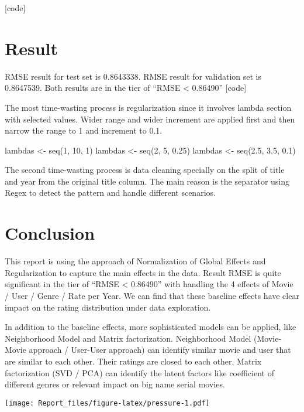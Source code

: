 \documentclass[
]{article}
\begin{document}
{[}code{]}

\hypertarget{result}{%
\section{Result}\label{result}}

RMSE result for test set is 0.8643338. RMSE result for validation set is
0.8647539. Both results are in the tier of ``RMSE \textless{} 0.86490''
{[}code{]}

The most time-wasting process is regularization since it involves lambda
section with selected values. Wider range and wider increment are
applied first and then narrow the range to 1 and increment to 0.1.

lambdas \textless- seq(1, 10, 1) lambdas \textless- seq(2, 5, 0.25)
lambdas \textless- seq(2.5, 3.5, 0.1)

The second time-wasting process is data cleaning specially on the split
of title and year from the original title column. The main reason is the
separator using Regex to detect the pattern and handle different
scenarios.

\hypertarget{conclusion}{%
\section{Conclusion}\label{conclusion}}

This report is using the approach of Normalization of Global Effects and
Regularization to capture the main effects in the data. Result RMSE is
quite significant in the tier of ``RMSE \textless{} 0.86490'' with
handling the 4 effects of Movie / User / Genre / Rate per Year. We can
find that these baseline effects have clear impact on the rating
distribution under data exploration.

In addition to the baseline effects, more sophisticated models can be
applied, like Neighborhood Model and Matrix factorization. Neighborhood
Model (Movie-Movie approach / User-User approach) can identify similar
movie and user that are similar to each other. Their ratings are closed
to each other. Matrix factorization (SVD / PCA) can identify the latent
factors like coefficient of different genres or relevant impact on big
name serial movies.

\texttt{[image: Report\_files/figure-latex/pressure-1.pdf]}
\end{document}
